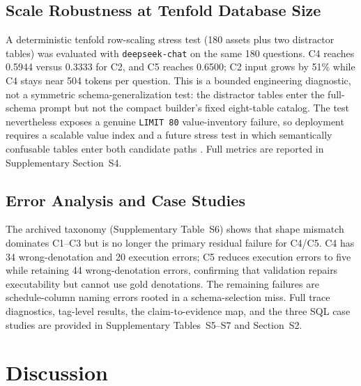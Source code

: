 \documentclass[applsci,article,submit,moreauthors]{Definitions/mdpi}
\begin{document}
\subsection{Scale Robustness at Tenfold Database Size}\label{scale-robustness}

A deterministic tenfold row-scaling stress test (180 assets plus two distractor tables) was evaluated with \texttt{deepseek-chat} on the same 180 questions. C4 reaches 0.5944 versus 0.3333 for C2, and C5 reaches 0.6500; C2 input grows by 51\% while C4 stays near 504 tokens per question. This is a bounded engineering diagnostic, not a symmetric schema-generalization test: the distractor tables enter the full-schema prompt but not the compact builder's fixed eight-table catalog. The test nevertheless exposes a genuine \texttt{LIMIT 80} value-inventory failure, so deployment requires a scalable value index and a future stress test in which semantically confusable tables enter both candidate paths \cite{talaei2024chess}. Full metrics are reported in Supplementary Section~S4.

\subsection{Error Analysis and Case Studies}\label{sect:r5}

The archived taxonomy (Supplementary Table~S6) shows that shape mismatch dominates C1--C3 but is no longer the primary residual failure for C4/C5. C4 has 34 wrong-denotation and 20 execution errors; C5 reduces execution errors to five while retaining 44 wrong-denotation errors, confirming that validation repairs executability but cannot use gold denotations. The remaining failures are schedule-column naming errors rooted in a schema-selection miss. Full trace diagnostics, tag-level results, the claim-to-evidence map, and the three SQL case studies are provided in Supplementary Tables~S5--S7 and Section~S2.

\section{Discussion}\label{sect:r6}
\end{document}
